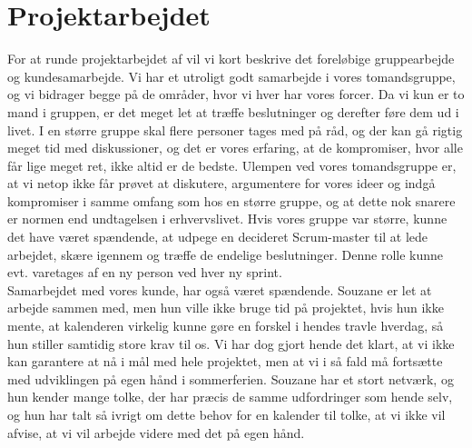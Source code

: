 \documentclass[12pt]{article}   %
\begin{document}
\section{Projektarbejdet}
For at runde projektarbejdet af vil vi kort beskrive det foreløbige gruppearbejde og kundesamarbejde. Vi har et utroligt godt samarbejde i vores tomandsgruppe, og vi bidrager begge på de områder, hvor vi hver har vores forcer. Da vi kun er to mand i gruppen, er det meget let at træffe beslutninger og derefter føre dem ud i livet. I en større gruppe skal flere personer tages med på råd, og der kan gå rigtig meget tid med diskussioner, og det er vores erfaring, at de kompromiser, hvor alle får lige meget ret, ikke altid er de bedste. Ulempen ved vores tomandsgruppe er, at vi netop ikke får prøvet at diskutere, argumentere for vores ideer og indgå kompromiser i samme omfang som hos en større gruppe, og at dette nok snarere er normen end undtagelsen i erhvervslivet. Hvis vores gruppe var større, kunne det have været spændende, at udpege en decideret Scrum-master til at lede arbejdet, skære igennem og træffe de endelige beslutninger. Denne rolle kunne evt. varetages af en ny person ved hver ny sprint. \\
Samarbejdet med vores kunde, har også været spændende. Souzane er let at arbejde sammen med, men hun ville ikke bruge tid på projektet, hvis hun ikke mente, at kalenderen virkelig kunne gøre en forskel i hendes travle hverdag, så hun stiller samtidig store krav til os. Vi har dog gjort hende det klart, at vi ikke kan garantere at nå i mål med hele projektet, men at vi i så fald må fortsætte med udviklingen på egen hånd i sommerferien. Souzane har et stort netværk, og hun kender mange tolke, der har præcis de samme udfordringer som hende selv, og hun har talt så ivrigt om dette behov for en kalender til tolke, at vi ikke vil afvise, at vi vil arbejde videre med det på egen hånd. \\ 
\end{document}
